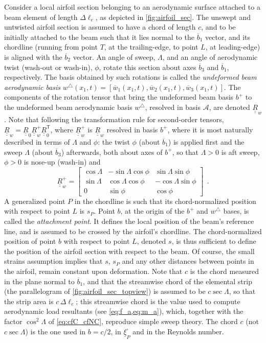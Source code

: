 \documentclass[12pt,a4paper,oneside,english]{abntex2} %
\newcommand{\fix}[1]{{\color{red}#1}}
\newcommand{\vect}[1]{\underline{#1}}
\newcommand{\uvec}[1]{\overline{#1}}
\def\tens#1{\underline{\underline{#1}}}
\def\T{\mathsf{T}}
\def\A{\mathcal{A}}
\def\bp{b^+}
\def\wt{w^{\triangle}}
\def\xo{x_1}
\def\R{\tens{R}}
\def\Rw{\R_w}
\def\Rz{\R_0}
\def\RzT{\R^\T_0}
\def\Deltal{\Delta \ell_e}
\begin{document}
Consider a local airfoil section belonging to an aerodynamic surface attached to a beam element of length $\Deltal$, as depicted in \cref{fig:airfoil_sec}. The unswept and untwisted airfoil section is assumed to \fix{have} a chord of length $c$, and to be initially attached to the beam such that it lies normal to the $\uvec{b}_1$ vector, and its chordline (running from point $T$, at the trailing-edge, to point $L$, at leading-edge) is aligned with the $\uvec{b}_2$ vector. An angle of sweep, $\Lambda$, and an angle of aerodynamic twist (wash-out or wash-in), $\phi$, rotate this section about axes $\uvec{b}_3$ and $\uvec{b}_1$, respectively. The basis obtained by such rotations is called the \textit{undeformed beam aerodynamic basis} $\wt(\xo,t) = [\uvec{w}_1(\xo,t),\uvec{w}_2(\xo,t),\uvec{w}_3(\xo,t)]$. The components of the rotation tensor that bring the undeformed beam basis $\bp$ to the undeformed beam aerodynamic basis $\wt$, resolved in basis $\A$, are denoted $\Rw$. Note that following the transformation rule for second-order tensors, $\Rw=\Rz\Rw^+\RzT$, where $\Rw^+$ is $\Rw$ resolved in basis $\bp$, where it is most naturally described in terms of $\Lambda$ and $\phi$\fix{: the twist $\phi$ (about $\uvec{b}_1$) is applied first and the sweep $\Lambda$ (about $\uvec{b}_3$) afterwards, both about axes of $\bp$, so that $\Lambda>0$ is aft sweep, $\phi>0$ is nose-up (wash-in) and
\begin{equation}
    \Rw^+ = \begin{bmatrix}\cos\Lambda & -\sin\Lambda\cos\phi & \sin\Lambda\sin\phi\\ \sin\Lambda & \cos\Lambda\cos\phi & -\cos\Lambda\sin\phi\\ 0 & \sin\phi & \cos\phi\end{bmatrix}\ \ .
    \label{eq:Rwp_explicit}
\end{equation}} A generalized point $P$ in the chordline is such that its chord-normalized position with respect to point $L$ is $s_P$. Point $b$, at the origin of the $\bp$ and $\wt$ bases, is called the \textit{attachment point}. It defines the local position of the beam's reference line, and is assumed to be crossed by the airfoil's chordline. The chord-normalized position of point $b$ with respect to point $L$, denoted $s$, is thus sufficient to define the position of the airfoil section with respect to the beam. Of course, the small strains assumption implies that $s$, $s_P$ and any other distances between points in the airfoil, remain constant upon deformation. \fix{Note that $c$ is the chord measured in the plane normal to $\uvec{b}_1$, and that the streamwise chord of the elemental strip (the parallelogram of \cref{fig:airfoil_sec_topview}) is assumed to be $c\sec\Lambda$, so that the strip area is $c\,\Deltal$; this streamwise chord is the value used to compute aerodynamic load resultants (see \cref{eq:f_a,eq:m_a}), which, together with the factor $\cos^2\Lambda$ of \cref{eq:cfC_cfNC}, reproduce simple sweep theory. The chord $c$ (not $c\sec\Lambda$) is the one used in $b=c/2$, in $\vect{\xi}_P^\square$ and in the Reynolds number.}
\end{document}
